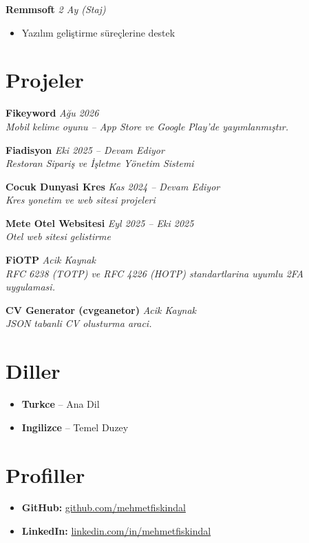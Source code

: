 \documentclass[11pt,a4paper]{article}
\begin{document}
\vspace{6pt}

\textbf{Remmsoft} \hfill \textit{2 Ay (Staj)}\\
\begin{itemize}[leftmargin=*, nosep]
\item Yazılım geliştirme süreçlerine destek
\end{itemize}

\vspace{2pt}

\section{Projeler}
\textbf{Fikeyword} \hfill \textit{Ağu 2026}\\
\textit{Mobil kelime oyunu -- App Store ve Google Play'de yayımlanmıştır.}

\textbf{Fiadisyon} \hfill \textit{Eki 2025 – Devam Ediyor}\\
\textit{Restoran Sipariş ve İşletme Yönetim Sistemi}

\textbf{Cocuk Dunyasi Kres} \hfill \textit{Kas 2024 – Devam Ediyor}\\
\textit{Kres yonetim ve web sitesi projeleri}

\textbf{Mete Otel Websitesi} \hfill \textit{Eyl 2025 – Eki 2025}\\
\textit{Otel web sitesi gelistirme}

\textbf{FiOTP} \hfill \textit{Acik Kaynak}\\
\textit{RFC 6238 (TOTP) ve RFC 4226 (HOTP) standartlarina uyumlu 2FA uygulamasi.}

\textbf{CV Generator (cvgeanetor)} \hfill \textit{Acik Kaynak}\\
\textit{JSON tabanli CV olusturma araci.}

\vspace{2pt}

\section{Diller}
\begin{itemize}[leftmargin=*, nosep]
\item \textbf{Turkce} -- Ana Dil
\item \textbf{Ingilizce} -- Temel Duzey
\end{itemize}

\vspace{2pt}

\section{Profiller}
\begin{itemize}[leftmargin=*, nosep]
\item \textbf{GitHub:} \href{https://github.com/mehmetfiskindal}{github.com/mehmetfiskindal}
\item \textbf{LinkedIn:} \href{https://www.linkedin.com/in/mehmetfiskindal}{linkedin.com/in/mehmetfiskindal}
\end{itemize}
\end{document}

